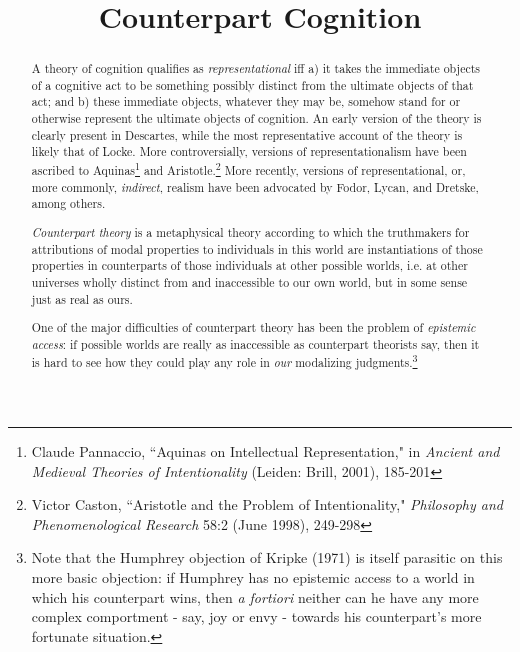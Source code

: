 \documentclass[]{article}
\title{Counterpart Cognition}
\author{}
\begin{document}
\maketitle

\begin{abstract}
A theory of cognition qualifies as \textit{representational} iff a) it takes the immediate objects of a cognitive act to be something possibly distinct from the ultimate objects of that act; and b) these immediate objects, whatever they may be, somehow stand for or otherwise represent the ultimate objects of cognition. An early version of the theory is clearly present in Descartes, while the most representative account of the theory is likely that of Locke. More controversially, versions of representationalism have been ascribed to Aquinas\footnote{Claude Pannaccio, ``Aquinas on Intellectual Representation," in \textit{Ancient and Medieval Theories of Intentionality} (Leiden: Brill, 2001), 185-201} and Aristotle.\footnote{Victor Caston, ``Aristotle and the Problem of Intentionality," \textit{Philosophy and Phenomenological Research} 58:2 (June 1998), 249-298} More recently, versions of representational, or, more commonly, \textit{indirect}, realism have been advocated by Fodor, Lycan, and Dretske, among others.

\textit{Counterpart theory} is a metaphysical theory according to which the truthmakers for attributions of modal properties to individuals in this world are instantiations of those properties in counterparts of those individuals at other possible worlds, i.e. at other universes wholly distinct from and inaccessible to our own world, but in some sense just as real as ours. 

One of the major difficulties of counterpart theory has been the problem of \textit{epistemic access}: if possible worlds are really as inaccessible as counterpart theorists say, then it is hard to see how they could play any role in \textit{our} modalizing judgments.\footnote{Note that the Humphrey objection of Kripke (1971) is itself parasitic on this more basic objection: if Humphrey has no epistemic access to a world in which his counterpart wins, then \textit{a fortiori} neither can he have any more complex comportment - say, joy or envy - towards his counterpart's more fortunate situation.}


\end{abstract}
\end{document}
